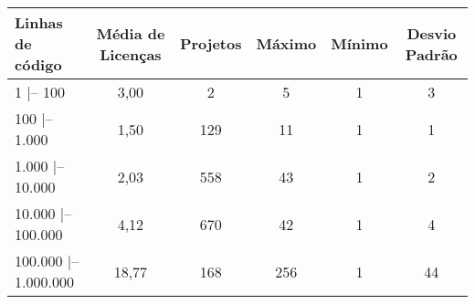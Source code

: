     \begin{tabular}{l c c c c c}
        \hline Linhas de código & Média de Licenças & Projetos & Máximo & Mínimo & Desvio  Padrão\\
        \hline        
1 |-- 100               & 3,00    & 2     & 5    &  1   &   3\\
100 |-- 1.000           & 1,50    & 129   & 11   &  1   &   1\\
1.000 |-- 10.000        & 2,03    & 558   & 43   &  1   &   2 \\
10.000 |-- 100.000      & 4,12    & 670   & 42   &  1   &   4 \\
100.000 |-- 1.000.000   & 18,77   & 168   & 256  &  1   &   44  \\
        \hline
    \end{tabular}